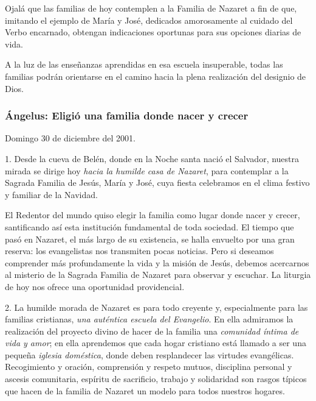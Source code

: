 \begin{body}
\begin{body}
Ojalá que las familias de hoy contemplen a la Familia de Nazaret a fin de que, imitando el ejemplo de María y José, dedicados amorosamente al cuidado del Verbo encarnado, obtengan indicaciones oportunas para sus opciones diarias de vida.

A la luz de las enseñanzas aprendidas en esa escuela insuperable, todas las familias podrán orientarse en el camino hacia la plena realización del designio de Dios.

\subsubsection{Ángelus: Eligió una familia donde nacer y crecer}

Domingo 30 de diciembre del 2001.

1. Desde la cueva de Belén, donde en la Noche santa nació el Salvador, nuestra mirada se dirige hoy \emph{hacia la humilde casa de Nazaret}, para contemplar a la Sagrada Familia de Jesús, María y José, cuya fiesta celebramos en el clima festivo y familiar de la Navidad.

El Redentor del mundo quiso elegir la familia como lugar donde nacer y crecer, santificando así esta institución fundamental de toda sociedad. El tiempo que pasó en Nazaret, el más largo de su existencia, se halla envuelto por una gran reserva: los evangelistas nos transmiten pocas noticias. Pero si deseamos comprender más profundamente la vida y la misión de Jesús, debemos acercarnos al misterio de la Sagrada Familia de Nazaret para observar y escuchar. La liturgia de hoy nos ofrece una oportunidad providencial.

2. La humilde morada de Nazaret es para todo creyente y, especialmente para las familias cristianas, \emph{una auténtica escuela del Evangelio}. En ella admiramos la realización del proyecto divino de hacer de la familia una \emph{comunidad íntima de vida y amor}; en ella aprendemos que cada hogar cristiano está llamado a ser una pequeña \emph{iglesia doméstica}, donde deben resplandecer las virtudes evangélicas. Recogimiento y oración, comprensión y respeto mutuos, disciplina personal y ascesis comunitaria, espíritu de sacrificio, trabajo y solidaridad son rasgos típicos que hacen de la familia de Nazaret un modelo para todos nuestros hogares.


\end{body}
\end{body}
